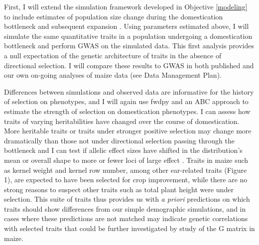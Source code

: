 First, I will extend the simulation framework developed in Objective \ref{modeling} to include estimates of population size change during the domestication bottleneck and subsequent expansion \citep{Wright:2005}. Using parameters estimated above, I will simulate the same quantitative traits in a population undergoing a domestication bottleneck and perform GWAS on the simulated data. This first analysis provides a null expectation of the genetic architecture of traits in the absence of directional selection. I will compare these results to GWAS in both published \citep{Wallace:2014} and our own on-going analyses of maize data (see Data Management Plan). 


Differences between simulations and observed data are informative for the history of selection on phenotypes, and I will again use fwdpy and an ABC approach to estimate the strength of selection on domestication phenotypes. %
I can assess how traits of varying heritabilities have changed over the course of domestication. 
More heritable traits or traits under stronger positive selection may change more dramatically
 than those not under directional selection passing through the bottleneck and I can test if allelic effect sizes have shifted in the distribution's mean or overall shape to more or fewer loci of large effect \citep{Chevin:2008}. %
Traits in maize such as kernel weight and kernel row number, among other ear-related traits (Figure 1), are expected to have been selected for crop improvement, while there are no strong reasons to suspect other traits such as total plant height were under selection. This suite of traits thus provides us with \emph{a priori} predictions on which traits should show differences from our simple demographic simulations, and in cases where these predictions are not matched may indicate genetic correlations with selected traits that could be further investigated by study of the G matrix in maize. 


